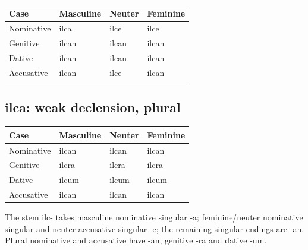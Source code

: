 \par\begingroup
\fontsize{10.5}{13.2}\selectfont
\setlength{\LTleft}{0pt}\setlength{\LTright}{\fill}
\noindent
\begin{tabular}{@{}>{\raggedright\arraybackslash}p{28.89mm}>{\raggedright\arraybackslash}p{28.89mm}>{\raggedright\arraybackslash}p{28.89mm}>{\raggedright\arraybackslash}p{28.89mm}@{}}
\toprule
\textbf{Case} & \textbf{Masculine} & \textbf{Neuter} & \textbf{Feminine} \\
\midrule
Nominative & ilca & ilce & ilce \\
Genitive & ilcan & ilcan & ilcan \\
Dative & ilcan & ilcan & ilcan \\
Accusative & ilcan & ilce & ilcan \\
\bottomrule
\end{tabular}
\par\endgroup

\subsection*{ilca: weak declension, plural}

\par\begingroup
\fontsize{10.5}{13.2}\selectfont
\setlength{\LTleft}{0pt}\setlength{\LTright}{\fill}
\noindent
\begin{tabular}{@{}>{\raggedright\arraybackslash}p{28.89mm}>{\raggedright\arraybackslash}p{28.89mm}>{\raggedright\arraybackslash}p{28.89mm}>{\raggedright\arraybackslash}p{28.89mm}@{}}
\toprule
\textbf{Case} & \textbf{Masculine} & \textbf{Neuter} & \textbf{Feminine} \\
\midrule
Nominative & ilcan & ilcan & ilcan \\
Genitive & ilcra & ilcra & ilcra \\
Dative & ilcum & ilcum & ilcum \\
Accusative & ilcan & ilcan & ilcan \\
\bottomrule
\end{tabular}
\par\endgroup

The stem ilc- takes masculine nominative singular -a; feminine/\allowbreak{}neuter nominative singular and neuter accusative singular -e; the remaining singular endings are -an. Plural nominative and accusative have -an, genitive -ra and dative -um.

